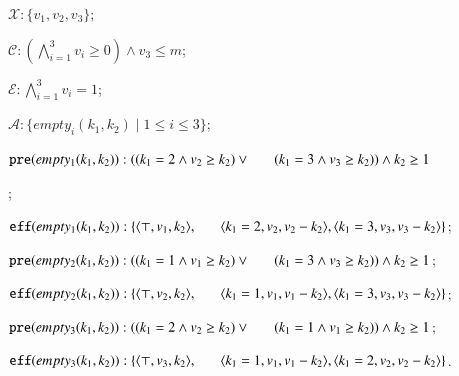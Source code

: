 \documentclass[review]{elsarticle}
\newcommand{\set}[1]{\{ #1 \}}
\newcommand{\tuple}[1]{\langle {#1} \rangle}
\newcommand{\true}{\top}
\newcommand{\statevar}{\mathcal{X}}
\newcommand{\act}{\mathcal{A}}
\newcommand{\constraint}{\mathcal{C}}
\newcommand{\estate}{\mathcal{E}}
\newcommand{\pre}{\mathtt{pre}}
\newcommand{\eff}{\mathtt{eff}}
\begin{document}
\begin{itemize}
	\item $\statevar: \set{v_1, v_2, v_3}$;
	\item $\constraint: (\bigwedge_{i=1}^{3} v_i \ge 0) \wedge v_3 \le m$;
	\item $\estate: \bigwedge_{i=1}^{3} v_i = 1$;
	\item $\act:\set{empty_i(k_1, k_2)\mid 1\le i\le 3}$;
	\textcolor{red}{\item $\pre(empty_1(k_1, k_2)) : ((k_1 =2 \wedge v_2 \ge k_2) \vee\\
	 \hspace*{6mm}(k_1=3 \wedge v_3 \ge k_2)) \wedge k_2\ge 1$};
	\item $\eff(empty_1(k_1, k_2)) : \set{\tuple{\true, v_1, k_2}, \\
		\hspace*{6mm}\tuple{k_1=2, v_2, v_2 - k_2}, \tuple{k_1=3, v_3, v_3 - k_2}}$;
	\item $\pre(empty_2(k_1, k_2)) : ((k_1 =1 \wedge v_1 \ge k_2) \vee\\
	\hspace*{6mm}(k_1=3 \wedge v_3 \ge k_2)) \wedge k_2\ge 1$;
	\item $\eff(empty_2(k_1, k_2)) : \set{\tuple{\true, v_2, k_2}, \\
		\hspace*{6mm} \tuple{k_1=1, v_1, v_1 - k_2}, \tuple{k_1=3, v_3, v_3 - k_2}}$;
	\item $\pre(empty_3(k_1, k_2)) : ((k_1 =2 \wedge v_2 \ge k_2) \vee \\
	\hspace*{6mm}(k_1=1 \wedge v_1 \ge k_2)) \wedge k_2\ge 1$;
	\item $\eff(empty_3(k_1, k_2)) : \set{\tuple{\true, v_3, k_2},\\
		\hspace*{6mm}\tuple{k_1=1, v_1, v_1 - k_2}, \tuple{k_1=2, v_2, v_2 - k_2}}$.
\end{itemize}
\end{document}

